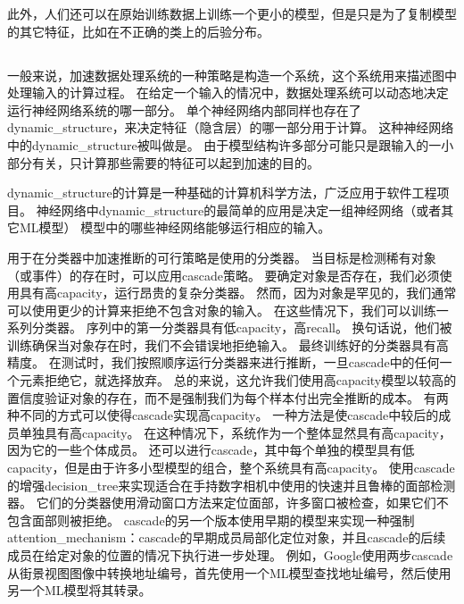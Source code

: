 此外，人们还可以在原始训练数据上训练一个更小的模型，但是只是为了复制模型的其它特征，比如在不正确的类上的后验分布\citep{Hinton-dark-2014,hinton2015distilling}。

\subsection{}
\label{sec:dynamic_structure}

一般来说，加速数据处理系统的一种策略是构造一个系统，这个系统用来描述图中处理输入的计算过程。
在给定一个输入的情况中，数据处理系统可以动态地决定运行神经网络系统的哪一部分。
单个神经网络内部同样也存在了\gls{dynamic_structure}，来决定特征（隐含层）的哪一部分用于计算。
这种神经网络中的\gls{dynamic_structure}被叫做是\citep{bengio2013estimating,bengio-arxiv13-condcomp}。
由于模型结构许多部分可能只是跟输入的一小部分有关，只计算那些需要的特征可以起到加速的目的。

\gls{dynamic_structure}的计算是一种基础的计算机科学方法，广泛应用于软件工程项目。
神经网络中\gls{dynamic_structure}的最简单的应用是决定一组神经网络（或者其它\gls{ML}模型）
模型中的哪些神经网络能够运行相应的输入。



用于在分类器中加速推断的可行策略是使用的分类器。 当目标是检测稀有对象（或事件）的存在时，可以应用\gls{cascade}策略。
要确定对象是否存在，我们必须使用具有高\gls{capacity}，运行昂贵的复杂分类器。 
然而，因为对象是罕见的，我们通常可以使用更少的计算来拒绝不包含对象的输入。
在这些情况下，我们可以训练一系列分类器。
序列中的第一分类器具有低\gls{capacity}，高\gls{recall}。
换句话说，他们被训练确保当对象存在时，我们不会错误地拒绝输入。
最终训练好的分类器具有高精度。
在测试时，我们按照顺序运行分类器来进行推断，一旦\gls{cascade}中的任何一个元素拒绝它，就选择放弃。
总的来说，这允许我们使用高\gls{capacity}模型以较高的置信度验证对象的存在，而不是强制我们为每个样本付出完全推断的成本。
有两种不同的方式可以使得\gls{cascade}实现高\gls{capacity}。
一种方法是使\gls{cascade}中较后的成员单独具有高\gls{capacity}。
在这种情况下，系统作为一个整体显然具有高\gls{capacity}，因为它的一些个体成员。 还可以进行\gls{cascade}，其中每个单独的模型具有低\gls{capacity}，但是由于许多小型模型的组合，整个系统具有高\gls{capacity}。
\citet{Viola01}使用\gls{cascade}的增强\gls{decision_tree}来实现适合在手持数字相机中使用的快速并且鲁棒的面部检测器。
它们的分类器使用滑动窗口方法来定位面部，许多窗口被检查，如果它们不包含面部则被拒绝。
\gls{cascade}的另一个版本使用早期的模型来实现一种强制\gls{attention_mechanism}：\gls{cascade}的早期成员局部化定位对象，并且\gls{cascade}的后续成员在给定对象的位置的情况下执行进一步处理。
例如，Google使用两步\gls{cascade}从街景视图图像中转换地址编号，首先使用一个\gls{ML}模型查找地址编号，然后使用另一个\gls{ML}模型将其转录\citep{Goodfellow+et+al-ICLR2014a}。

